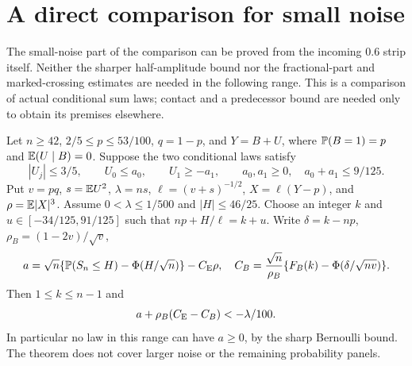 \section{A direct comparison for small noise}
\label{v10:smallnoise}

The small-noise part of the comparison can be proved from the incoming
$0.6$ strip itself. Neither the sharper half-amplitude bound nor the
fractional-part and marked-crossing estimates are needed in the following
range. This is a comparison of actual conditional sum laws; contact and a
predecessor bound are needed only to obtain its premises elsewhere.

\begin{theorem}\label{v10:smallnoise:theorem}
Let $n\ge42$, $2/5\le p\le53/100$, $q=1-p$, and $Y=B+U$, where
$\mathbb P(B=1)=p$ and $\mathbb E(U\mid B)=0$. Suppose the two conditional laws satisfy
\[
 |U_j|\le3/5,\qquad U_0\le a_0,\qquad U_1\ge-a_1,
 \qquad a_0,a_1\ge0,\quad a_0+a_1\le9/125.
\]
Put $v=pq$, $s=\mathbb E U^2$, $\lambda=ns$, $\ell=(v+s)^{-1/2}$,
$X=\ell(Y-p)$, and $\rho=\mathbb E|X|^3$. Assume
$0<\lambda\le1/500$ and $|H|\le46/25$.
Choose an integer $k$ and $u\in[-34/125,91/125]$ such that
$np+H/\ell=k+u$. Write $\delta=k-np$, $\rho_B=(1-2v)/\sqrt v$,
\[
 a=\sqrt n\{\mathbb P(S_n\le H)-\Phi(H/\sqrt n)\}-C_{\mathrm E}\rho,
 \quad
 C_B=\frac{\sqrt n}{\rho_B}
       \{F_B(k)-\Phi(\delta/\sqrt{nv})\}.
\]
Then $1\le k\le n-1$ and
\[
                 a+\rho_B(C_{\mathrm E}-C_B)<-\lambda/100.
\]
In particular no law in this range can have $a\ge0$, by the sharp
Bernoulli bound. The theorem does not cover larger noise or the remaining
probability panels.
\end{theorem}

